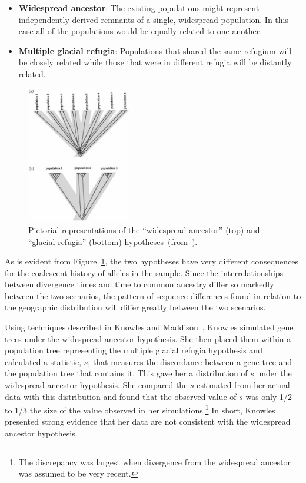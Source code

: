 \documentclass[12pt]{article}
\begin{document}
\begin{itemize}

\item {\bf Widespread ancestor}: The existing populations might represent
  independently derived remnants of a single, widespread
  population. In this case all of the populations would be equally
  related to one another.

\item {\bf Multiple glacial refugia}: Populations that shared the same
  refugium will be closely related while those that were in different
  refugia will be distantly related.

\end{itemize}

\begin{figure}
\begin{center}
\includegraphics[height=6cm]{divergence-hypotheses.eps}
\end{center}
\caption{Pictorial representations of the ``widespread ancestor''
  (top) and ``glacial refugia'' (bottom)
  hypotheses~(from~\cite{Knowles-2001}).}\label{fig:divergence-hypotheses}
\end{figure}

As is evident from Figure~\ref{fig:divergence-hypotheses}, the two
hypotheses have very different consequences for the coalescent history
of alleles in the sample. Since the interrelationships between
divergence times and time to common ancestry differ so markedly
between the two scenarios, the pattern of sequence differences found
in relation to the geographic distribution will differ greatly between
the two scenarios. 

Using techniques described in Knowles and
Maddison~\cite{Knowles-Maddison-2002}, Knowles simulated gene trees
under the widespread ancestor hypothesis. She then placed them within
a population tree representing the multiple glacial refugia hypothesis
and calculated a statistic, $s$, that measures the discordance between
a gene tree and the population tree that contains it. This gave her a
distribution of $s$ under the widespread ancestor hypothesis. She
compared the $s$ estimated from her actual data with this distribution
and found that the observed value of $s$ was only 1/2 to 1/3 the size
of the value observed in her simulations.\footnote{The discrepancy was
  largest when divergence from the widespread ancestor was assumed to
  be very recent.} In short, Knowles presented strong evidence that
her data are not consistent with the widespread ancestor
hypothesis.




\ccLicense
\end{document}
